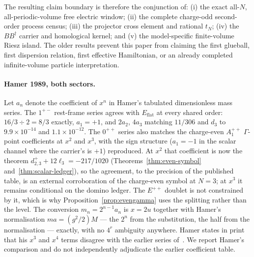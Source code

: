 \documentclass[11pt]{article}
\theoremstyle{plain}
\theoremstyle{definition}
\theoremstyle{remark}
\newcommand{\chk}[1]{}
\newcommand{\dg}{^{\dagger}}
\begin{document}
The resulting claim boundary is therefore the conjunction of: (i) the exact
all-$N$, all-periodic-volume free electric window; (ii) the complete
charge-odd second-order process census; (iii) the projector cross element and
rational $t_N$; (iv) the $BB\dg$ carrier and homological kernel; and (v) the
model-specific finite-volume Riesz island.  The older results prevent this
paper from claiming the first glueball, first dispersion relation, first
effective Hamiltonian, or an already completed infinite-volume particle
interpretation.

\paragraph{Hamer 1989, both sectors.} Let $a_n$ denote the coefficient of
$x^n$ in Hamer's tabulated dimensionless mass series. The $1^{+-}$ rest-frame series agrees
with $E_{\mathrm{flat}}$ at every shared order: $16/3\div2=8/3$ exactly,
$a_1=+1$, and $2a_2$, $4a_3$ matching $11/306$ and $d_3$ to $9.9\times10^{-14}$
and $1.1\times10^{-12}$. The $0^{++}$ series also matches the charge-even
$A_1^{++}$ $\Gamma$-point coefficients at $x^2$ and $x^3$, with the sign
structure ($a_1=-1$ in the scalar channel where the carrier's is $+1$)
reproduced. At $x^2$ that coefficient is now the theorem
$d^+_{2,3}+12\ell_3=-217/1020$ (Theorems~\ref{thm:even-symbol}
and~\ref{thm:scalar-ledger}), so the agreement, to the precision of the
published table, is an external corroboration of the charge-even symbol at
$N=3$; at $x^3$ it remains conditional on the domino ledger. The $E^{++}$ doublet is not constrained by it, which is why
Proposition~\ref{prop:evengamma} uses the splitting rather than the level. The conversion
$m_n=2^{n-1}a_n$ is $x=2u$ together
with Hamer's normalisation $ma=(g^2/2)M$ --- the $2^n$ from the substitution,
the half from the normalisation --- exactly, with no $4^r$ ambiguity anywhere.
Hamer states in print that his $x^3$ and $x^4$ terms disagree with the earlier
series of~\cite{KSS1976}. We report Hamer's comparison and do not independently
adjudicate the earlier coefficient table.
\chk{Hamer's 1+- series matches the C-odd Gamma-point coefficients through x\^{}3}
\chk{Hamer's 0++ series matches the C-even Gamma-point coefficients through x\^{}3}
\chk{the m\_n = 2\^{}(n-1) a\_n bridge is the x = 2u conversion}
\chk{the Hamer table metadata is pinned; no fourth-order agreement is used}
\end{document}
